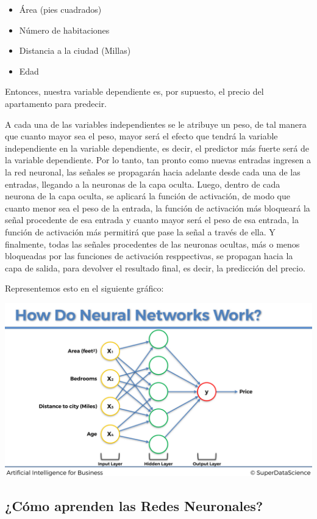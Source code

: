 \documentclass[
]{book}
\providecommand{\tightlist}{%
  \setlength{\itemsep}{0pt}\setlength{\parskip}{0pt}}
\begin{document}
\begin{itemize}
\tightlist
\item
  Área (pies cuadrados)
\item
  Número de habitaciones
\item
  Distancia a la ciudad (Millas)
\item
  Edad
\end{itemize}

Entonces, nuestra variable dependiente es, por supuesto, el precio del apartamento para predecir.

A cada una de las variables independientes se le atribuye un peso, de tal manera que cuanto mayor sea el peso, mayor será el efecto que tendrá la variable independiente en la variable dependiente, es decir, el predictor más fuerte será de la variable dependiente. Por lo tanto, tan pronto como nuevas entradas ingresen a la red neuronal, las señales se propagarán hacia adelante desde cada una de las entradas, llegando a la neuronas de la capa oculta. Luego, dentro de cada neurona de la capa oculta, se aplicará la función de activación, de modo que cuanto menor sea el peso de la entrada, la función de activación más bloqueará la señal procedente de esa entrada y cuanto mayor será el peso de esa entrada, la función de activación más permitirá que pase la señal a través de ella. Y finalmente, todas las señales procedentes de las neuronas ocultas, más o menos bloqueadas por las funciones de activación resppectivas, se propagan hacia la capa de salida, para devolver el resultado final, es decir, la predicción del precio.

Representemos esto en el siguiente gráfico:

\includegraphics{Images/ANN_17.png}

\hypertarget{cuxf3mo-aprenden-las-redes-neuronales}{%
\subsection{¿Cómo aprenden las Redes Neuronales?}\label{cuxf3mo-aprenden-las-redes-neuronales}}
\end{document}

